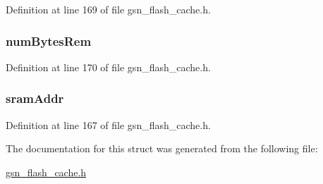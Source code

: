 Definition at line 169 of file gsn\_\-flash\_\-cache.h.

\hypertarget{a00075_a6f85c420fc2b2cec091bb54272d34a74}{
\subsubsection[{numBytesRem}]{ {\bf numBytesRem}}}
\label{a00075_a6f85c420fc2b2cec091bb54272d34a74}


Definition at line 170 of file gsn\_\-flash\_\-cache.h.

\hypertarget{a00075_a6b728d16c94f762108480a6f8f1e211c}{
\subsubsection[{sramAddr}]{ {\bf sramAddr}}}
\label{a00075_a6b728d16c94f762108480a6f8f1e211c}


Definition at line 167 of file gsn\_\-flash\_\-cache.h.



The documentation for this struct was generated from the following file:\begin{DoxyCompactItemize}
\item 
\hyperlink{a00500}{gsn\_\-flash\_\-cache.h}\end{DoxyCompactItemize}
